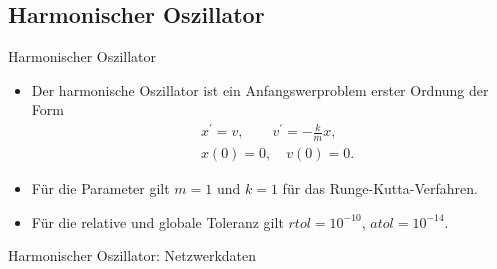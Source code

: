 \subsection{Harmonischer Oszillator}

\begin{frame}{Harmonischer Oszillator}
    \begin{itemize}
        \item<1-> Der harmonische Oszillator ist ein Anfangswerproblem erster Ordnung der Form
        \begin{align*}
            &x^{\prime}=v, \qquad v^{\prime}=-\frac{k}{m}x, \\
            &x(0)=0, \quad v(0)=0.
        \end{align*}
        \item<2-> Für die Parameter gilt $m=1$ und $k=1$ für das Runge-Kutta-Verfahren.
        \item<3-> Für die relative und globale Toleranz gilt $rtol=10^{-10}$, $atol=10^{-14}$.
    \end{itemize}
\end{frame}

\begin{frame}{Harmonischer Oszillator: Netzwerkdaten}
    \begin{table}
        \renewcommand{\arraystretch}{1.0}
        \centering
        \caption{Hyperparameter, Initialisierungsintervalle und Optimierungsparameter für den harmonischen Oszillator.}
        \label{stiff-table-data}
    \end{table}
\end{frame}

